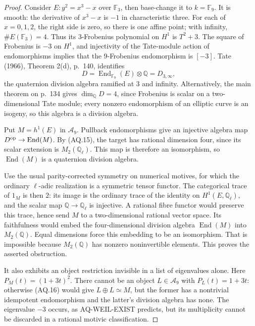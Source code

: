 \begin{proof}
Consider $E:y^2=x^3-x$ over $\mathbb F_3$, then
base-change it to $k=\mathbb F_9$. It is smooth:
the derivative of $x^3-x$ is $-1$ in characteristic
three. For each of $x=0,1,2$, the right side is
zero, so there is one affine point; with infinity,
$\#E(\mathbb F_3)=4$. Thus its $3$-Frobenius
polynomial on $H^1$ is $T^2+3$. The square of
Frobenius is $-3$ on $H^1$, and injectivity of
the Tate-module action of endomorphisms implies
that the $9$-Frobenius endomorphism is $[-3]$.
Tate (1966), Theorem 2(d), p.~140, identifies
\[
 D=\operatorname{End}_{\mathbb F_9}(E)\otimes\mathbb Q
   =D_{3,\infty},
\]
the quaternion division algebra ramified at $3$
and infinity. Alternatively, the main theorem
on p.~134 gives $\dim_{\mathbb Q}D=4$, since
Frobenius is scalar on a two-dimensional Tate
module; every nonzero endomorphism of an elliptic
curve is an isogeny, so this algebra is a division
algebra.

Put $M=h^1(E)$ in $\mathcal A_9$. Pullback
endomorphisms give an injective algebra map
$D^{\rm op}\to\operatorname{End}(M)$.
By (AQ.15), the target has rational dimension
four, since its scalar extension is
$M_2(\mathbb Q_\ell)$. This map is therefore
an isomorphism, so $\operatorname{End}(M)$ is
a quaternion division algebra.

Use the usual parity-corrected symmetry on
numerical motives, for which the ordinary
$\ell$-adic realization is a symmetric tensor
functor. The categorical trace of $1_M$ is
then $2$: its image is the ordinary trace of
the identity on $H^1(E,\mathbb Q_\ell)$,
and the scalar map $\mathbb Q\to\mathbb Q_\ell$
is injective. A rational fibre functor would
preserve this trace, hence send $M$ to a
two-dimensional rational vector space. Its
faithfulness would embed the four-dimensional
division algebra $\operatorname{End}(M)$ into
$M_2(\mathbb Q)$. Equal dimensions force this
embedding to be an isomorphism. That is
impossible because $M_2(\mathbb Q)$ has
nonzero noninvertible elements. This proves
the asserted obstruction.

It also exhibits an object restriction invisible
in a list of eigenvalues alone. Here
$P_M(t)=(1+3t)^2$. There cannot be an object
$L\in\mathcal A_9$ with $P_L(t)=1+3t$:
otherwise (AQ.16) would give $L\oplus L\simeq M$,
but the former has a nontrivial idempotent
endomorphism and the latter's division algebra
has none. The eigenvalue $-3$ occurs, as
AQ-WEIL-EXIST predicts, but its multiplicity
cannot be discarded in a rational motivic
classification.
\end{proof}

